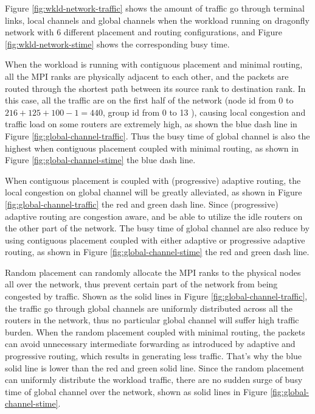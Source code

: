 \documentclass[conference,compsoc]{IEEEtran}
\begin{document}
Figure \ref{fig:wkld-network-traffic} shows the amount of traffic go through terminal links, local channels and global channels when the workload running on dragonfly network with 6 different placement and routing configurations, and Figure \ref{fig:wkld-network-stime} shows the corresponding busy time. 

When the workload is running with contiguous placement and minimal routing, all the MPI ranks are physically adjacent to each other, and the packets are routed through the shortest path between its source rank to destination rank. In this case, all the traffic are on the first half of the network (node id from 0 to $216+125+100-1=440$, group id from 0 to 13 ), causing local congestion and traffic load on some routers are extremely high, as shown the blue dash line in Figure \ref{fig:global-channel-traffic}. Thus the busy time of global channel is also the highest when contiguous placement coupled with minimal routing, as shown in Figure \ref{fig:global-channel-stime} the blue dash line. 

When contiguous placement is coupled with (progressive) adaptive routing, the local congestion on global channel will be greatly alleviated, as shown in Figure \ref{fig:global-channel-traffic} the red and green dash line. Since (progressive) adaptive routing are congestion aware, and be able to utilize the idle routers on the other part of the network. The busy time of global channel are also reduce by using contiguous placement coupled with either adaptive or progressive adaptive routing, as shown in Figure \ref{fig:global-channel-stime} the red and green dash line. 

Random placement can randomly allocate the MPI ranks to the physical nodes all over the network, thus prevent certain part of the network from being congested by traffic. Shown as the solid lines in Figure \ref{fig:global-channel-traffic}, the traffic go through global channels are uniformly distributed across all the routers in the network, thus no particular global channel will suffer high traffic burden. When the random placement coupled with minimal routing, the packets can avoid unnecessary intermediate forwarding as introduced by adaptive and progressive routing, which results in generating less traffic. That's why the blue solid line is lower than the red and green solid line. Since the random placement can uniformly distribute the workload traffic, there are no sudden surge of busy time of global channel over the network, shown as solid lines in Figure \ref{fig:global-channel-stime}.
\end{document}
